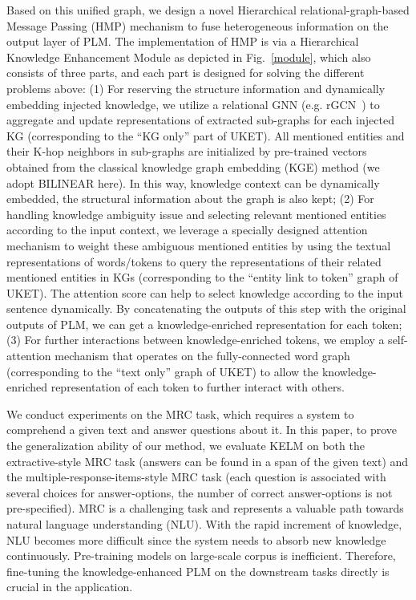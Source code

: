 \documentclass{article} \usepackage{iclr2022_conference,times}
\begin{document}
Based on this unified graph, we design a novel Hierarchical relational-graph-based Message Passing (HMP) mechanism to fuse heterogeneous information on the output layer of PLM. The implementation of HMP is via a Hierarchical Knowledge Enhancement Module as depicted in Fig.~\ref{module}, which also consists of three parts, and each part is designed for solving the different problems above: 
(1) For reserving the structure information and dynamically embedding injected knowledge, we utilize a relational GNN (e.g. rGCN~\citep{schlichtkrull2017modeling}) to aggregate and update representations of extracted sub-graphs for each injected KG (corresponding to the ``KG only'' part of UKET). All mentioned entities and their K-hop neighbors in sub-graphs are initialized by pre-trained vectors obtained from the classical knowledge graph embedding (KGE) method (we adopt BILINEAR here). In this way, knowledge context can be dynamically embedded, the structural information about the graph is also kept;
(2) For handling knowledge ambiguity issue and selecting relevant mentioned entities according to the input context, we leverage a specially designed attention mechanism to weight these ambiguous mentioned entities by using the textual representations of words/tokens to query the representations of their related mentioned entities in KGs (corresponding to the ``entity link to token'' graph of UKET). The attention score can help to select knowledge according to the input sentence dynamically. By concatenating the outputs of this step with the original outputs of PLM, we can get a knowledge-enriched representation for each token;
(3) For further interactions between knowledge-enriched tokens, we employ a self-attention mechanism that operates on the fully-connected word graph (corresponding to the ``text only'' graph of UKET) to allow the knowledge-enriched representation of each token to further interact with others.

We conduct experiments on the MRC task, which requires a system to comprehend a given text and answer questions about it. 
In this paper, to prove the generalization ability of our method, we evaluate KELM on both the extractive-style MRC task (answers can be found in a span of the given text) and the multiple-response-items-style MRC task (each question is associated with several choices for answer-options, the number of correct answer-options is not pre-specified).
MRC is a challenging task and represents a valuable path towards natural language understanding (NLU). With the rapid increment of knowledge, NLU becomes more difficult since the system needs to absorb new knowledge continuously. Pre-training models on large-scale corpus is inefficient. Therefore, fine-tuning the knowledge-enhanced PLM on the downstream tasks directly is crucial in the application.
\end{document}
